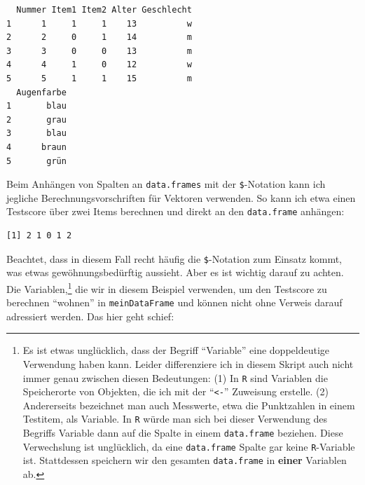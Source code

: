 \documentclass[12pt,]{tufte-book}
\newenvironment{Shaded}{\begin{snugshade}}{\end{snugshade}}
\newcommand{\StringTok}[1]{\textcolor[rgb]{0.31,0.60,0.02}{#1}}
\newcommand{\OperatorTok}[1]{\textcolor[rgb]{0.81,0.36,0.00}{\textbf{#1}}}
\newcommand{\NormalTok}[1]{#1}
\theoremstyle{definition}
\theoremstyle{definition}
\theoremstyle{definition}
\theoremstyle{remark}
\begin{document}
\begin{verbatim}
  Nummer Item1 Item2 Alter Geschlecht
1      1     1     1    13          w
2      2     0     1    14          m
3      3     0     0    13          m
4      4     1     0    12          w
5      5     1     1    15          m
  Augenfarbe
1       blau
2       grau
3       blau
4      braun
5       grün
\end{verbatim}

Beim Anhängen von Spalten an \texttt{data.frames} mit der
\texttt{\$}-Notation kann ich jegliche Berechnungsvorschriften für
Vektoren verwenden. So kann ich etwa einen Testscore über zwei Items
berechnen und direkt an den \texttt{data.frame} anhängen:

\begin{Shaded}
\end{Shaded}

\begin{verbatim}
[1] 2 1 0 1 2
\end{verbatim}

Beachtet, dass in diesem Fall recht häufig die \texttt{\$}-Notation zum
Einsatz kommt, was etwas gewöhnungsbedürftig aussieht. Aber es ist
wichtig darauf zu achten. Die Variablen,\footnote{Es ist etwas
  unglücklich, dass der Begriff ``Variable'' eine doppeldeutige
  Verwendung haben kann. Leider differenziere ich in diesem Skript auch
  nicht immer genau zwischen diesen Bedeutungen: (1) In \texttt{R} sind
  Variablen die Speicherorte von Objekten, die ich mit der
  ``\texttt{\textless{}-}'' Zuweisung erstelle. (2) Andererseits
  bezeichnet man auch Messwerte, etwa die Punktzahlen in einem Testitem,
  als Variable. In \texttt{R} würde man sich bei dieser Verwendung des
  Begriffs Variable dann auf die Spalte in einem \texttt{data.frame}
  beziehen. Diese Verwechslung ist unglücklich, da eine
  \texttt{data.frame} Spalte gar keine \texttt{R}-Variable ist.
  Stattdessen speichern wir den gesamten \texttt{data.frame} in
  \textbf{einer} Variablen ab.} die wir in diesem Beispiel verwenden, um
den Testscore zu berechnen ``wohnen'' in \texttt{meinDataFrame} und
können nicht ohne Verweis darauf adressiert werden. Das hier geht
schief:
\end{document}
